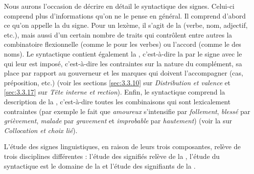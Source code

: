 Nous aurons l’occasion de décrire en détail le syntactique des signes. Celui-ci comprend plus d’informations qu’on ne le pense en général. Il comprend d’abord ce qu’on appelle la  du signe. Pour un lexème, il s’agit de la  (verbe, nom, adjectif, etc.), mais aussi d’un certain nombre de traits qui contrôlent entre autres la combinatoire flexionnelle (comme le  pour les verbes) ou l’accord (comme le  des noms). Le syntactique contient également la , c’est-à-dire la  par le signe avec le  qui leur est imposé, c’est-à-dire les contraintes sur la nature du complément, sa place par rapport au gouverneur et les marques qui doivent l’accompagner (cas, préposition, etc.) (voir les sections \ref{sec:3.3.10} sur \textit{Distribution et valence} et \ref{sec:3.3.17} sur \textit{Tête interne et rection}). Enfin, le syntactique comprend la description de la , c’est-à-dire toutes les combinaisons qui sont lexicalement contraintes (par exemple le fait que \textit{amoureux} s’intensifie par \textit{follement}, \textit{blessé} par \textit{grièvement}, \textit{malade} par \textit{gravement} et \textit{improbable} par \textit{hautement}) (voir la  sur \textit{Collocation et choix lié}).

L’étude des signes linguistiques, en raison de leurs trois composantes, relève de trois disciplines différentes : l’étude des signifiés relève de la , l’étude du syntactique est le domaine de la  et l’étude des signifiants de la .


